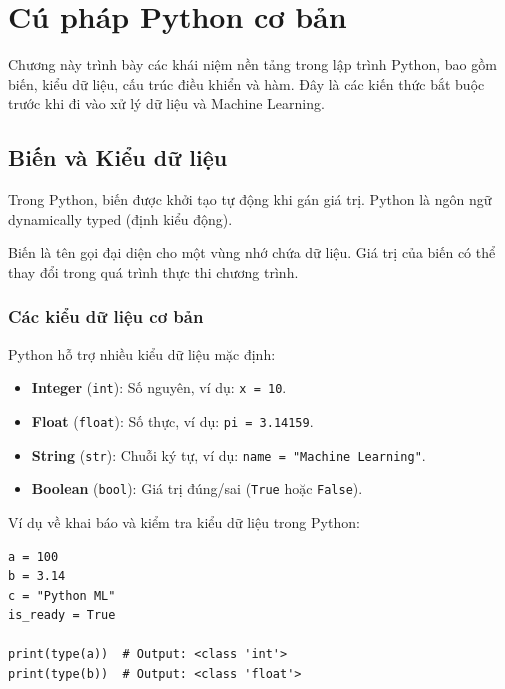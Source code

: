 \chapter{Cú pháp Python cơ bản}

Chương này trình bày các khái niệm nền tảng trong lập trình Python, bao gồm biến, kiểu dữ liệu, cấu trúc điều khiển và hàm. Đây là các kiến thức bắt buộc trước khi đi vào xử lý dữ liệu và Machine Learning.

\section{Biến và Kiểu dữ liệu}

Trong Python, biến được khởi tạo tự động khi gán giá trị. Python là ngôn ngữ dynamically typed (định kiểu động).

\begin{definition}
Biến là tên gọi đại diện cho một vùng nhớ chứa dữ liệu. Giá trị của biến có thể thay đổi trong quá trình thực thi chương trình.
\end{definition}

\subsection{Các kiểu dữ liệu cơ bản}
Python hỗ trợ nhiều kiểu dữ liệu mặc định:
\begin{itemize}
    \item \textbf{Integer} (\texttt{int}): Số nguyên, ví dụ: \texttt{x = 10}.
    \item \textbf{Float} (\texttt{float}): Số thực, ví dụ: \texttt{pi = 3.14159}.
    \item \textbf{String} (\texttt{str}): Chuỗi ký tự, ví dụ: \texttt{name = "Machine Learning"}.
    \item \textbf{Boolean} (\texttt{bool}): Giá trị đúng/sai (\texttt{True} hoặc \texttt{False}).
\end{itemize}

\begin{example}
Ví dụ về khai báo và kiểm tra kiểu dữ liệu trong Python:
\end{example}

\begin{lstlisting}[caption={Khai báo biến và hiển thị kiểu dữ liệu}]
a = 100
b = 3.14
c = "Python ML"
is_ready = True

print(type(a))  # Output: <class 'int'>
print(type(b))  # Output: <class 'float'>
\end{lstlisting}


